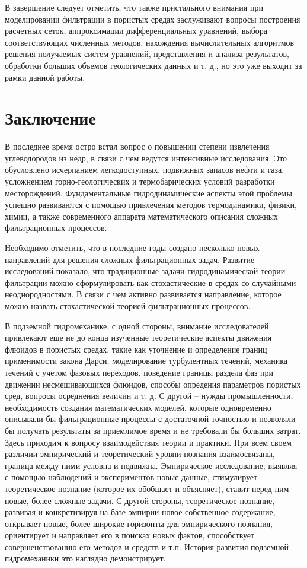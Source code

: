 В завершение следует отметить, что также пристального внимания при моделировании фильтрации в пористых средах заслуживают вопросы построения расчетных сеток,
аппроксимации дифференциальных уравнений, выбора соответствующих численных методов, нахождения вычислительных алгоритмов решения получаемых систем уравнений, представления и анализа результатов, обработки больших
объемов геологических данных и т. д., но это уже выходит за рамки данной работы.

\newpage
\section{Заключение}

В последнее время остро встал вопрос о повышении степени извлечения углеводородов из недр, в связи с чем ведутся интенсивные исследования. Это обусловлено исчерпанием легкодоступных, подвижных запасов нефти и газа,
усложнением горно-геологических и термобарических условий разработки месторождений. Фундаментальные гидродинамические аспекты этой проблемы успешно развиваются с помощью привлечения
методов термодинамики, физики, химии, а также современного аппарата математического описания сложных фильтрационных процессов.

Необходимо отметить, что в последние годы создано несколько новых направлений для решения сложных фильтрационных задач. Развитие исследований показало, что традиционные задачи гидродинамической теории фильтрации можно 
сформулировать как стохастические в средах со случайными неоднородностями. В связи с чем активно развивается направление, которое можно назвать стохастической теорией фильтрационных процессов.

В подземной гидромеханике, с одной стороны, внимание исследователей привлекают еще не до конца изученные теоретические аспекты движения флюидов в пористых средах, такие как уточнение и определение границ применимости
закона Дарси, моделирование турбулентных течений, механика течений с учетом фазовых переходов, поведение границы раздела фаз при движении несмешивающихся флюидов, способы опредения параметров пористых сред, вопросы осреднения
величин и т. д.
С другой -- нужды промышленности, необходимость создания математических моделей, которые одновременно описывали бы фильтрационные процессы с достаточной точностью и позволяли бы получать результаты за приемлимое время
и не требовали бы больших затрат.
Здесь приходим к вопросу взаимодействия теории и практики. При всем своем различии эмпирический и теоретический уровни познания взаимосвязаны, граница между ними условна и подвижна. 
Эмпирическое исследование, выявляя с помощью наблюдений и экспериментов новые данные, стимулирует теоретическое познание (которое их обобщает и объясняет), ставит перед ним новые, более сложные задачи. 
С другой стороны, теоретическое познание, развивая и конкретизируя на базе эмпирии новое собственное содержание, открывает новые, более широкие горизонты для эмпирического познания, ориентирует и 
направляет его в поисках новых фактов, способствует совершенствованию его методов и средств и т.п. История развития подземной гидромеханики это наглядно демонстрирует.